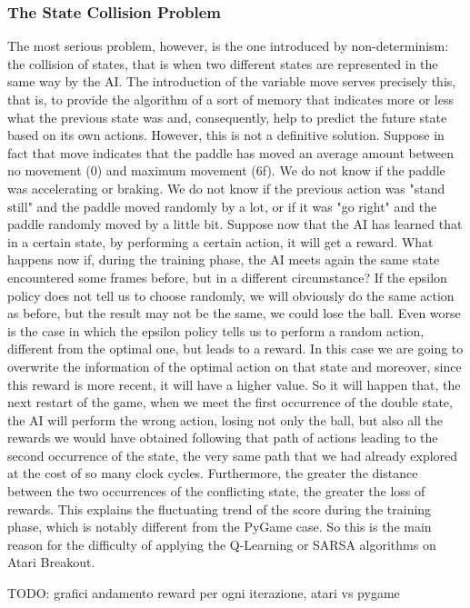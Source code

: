 \subsubsection{The State Collision Problem}

The most serious problem, however, is the one introduced by non-determinism: the collision of states, that is when two different states are represented in the same way by the AI. The introduction of the variable move serves precisely this, that is, to provide the algorithm of a sort of memory that indicates more or less what the previous state was and, consequently, help to predict the future state based on its own actions. However, this is not a definitive solution. Suppose in fact that move indicates that the paddle has moved an average amount between no movement (0) and maximum movement (6f). We do not know if the paddle was accelerating or braking. We do not know if the previous action was "stand still" and the paddle moved randomly by a lot, or if it was "go right" and the paddle randomly moved by a little bit. Suppose now that the AI ​​has learned that in a certain state, by performing a certain action, it will get a reward. What happens now if, during the training phase, the AI ​​meets again the same state encountered some frames before, but in a different circumstance? If the epsilon policy does not tell us to choose randomly, we will obviously do the same action as before, but the result may not be the same, we could lose the ball. Even worse is the case in which the epsilon policy tells us to perform a random action, different from the optimal one, but leads to a reward. In this case we are going to overwrite the information of the optimal action on that state and moreover, since this reward is more recent, it will have a higher value. So it will happen that, the next restart of the game, when we meet the first occurrence of the double state, the AI will perform the wrong action, losing not only the ball, but also all the rewards we would have obtained following that path of actions leading to the second occurrence of the state, the very same path that we had already explored at the cost of so many clock cycles. Furthermore, the greater the distance between the two occurrences of the conflicting state, the greater the loss of rewards. This explains the fluctuating trend of the score during the training phase, which is notably different from the PyGame case. So this is the main reason for the difficulty of applying the Q-Learning or SARSA algorithms on Atari Breakout.

\smallskip
TODO: grafici andamento reward per ogni iterazione, atari vs pygame
\smallskip

